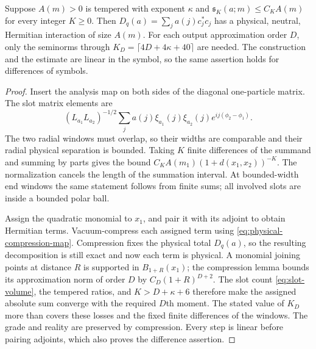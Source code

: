 \begin{lemma}\label{locality:one-body-symbol}
Suppose $A(m)>0$ is tempered with exponent $\kappa$ and
$\mathfrak s_K(a;m)\leq C_KA(m)$ for every integer $K\geq0$.
Then $D_q(a)=\sum_j a(j)c_j^*c_j$ has a physical, neutral, Hermitian
interaction of size $A(m)$.  For each output approximation order $D$,
only the seminorms through
$K_D=\lceil4D+4\kappa+40\rceil$ are needed.  The construction and
the estimate are linear in the symbol, so the same assertion holds
for differences of symbols.
\end{lemma}

\begin{proof}
Insert the analysis map on both sides of the diagonal one-particle
matrix.  The slot matrix elements are
\[
 (L_{a_1}L_{a_2})^{-1/2}\sum_j
   a(j)\xi_{a_1}(j)\xi_{a_2}(j)
                  e^{ij(\phi_2-\phi_1)}.
\]
The two radial windows must overlap, so their widths are comparable
and their radial physical separation is bounded.  Taking $K$
finite differences of the summand and summing by parts gives the
bound $C_K A(m_1)(1+d(x_1,x_2))^{-K}$.  The normalization cancels
the length of the summation interval.  At bounded-width end windows
the same statement follows from finite sums; all involved slots are
inside a bounded polar ball.

Assign the quadratic monomial to $x_1$, and pair it with its adjoint
to obtain Hermitian terms.  Vacuum-compress each assigned term using
\eqref{eq:physical-compression-map}.  Compression fixes the physical
total $D_q(a)$, so the resulting decomposition is still exact and
now each term is physical.  A monomial joining points at distance
$R$ is supported in $B_{1+R}(x_1)$; the compression lemma bounds its
approximation norm of order $D$ by $C_D(1+R)^{D+2}$.
The slot count \eqref{eq:slot-volume}, the tempered ratios, and
$K>D+\kappa+6$ therefore make the assigned absolute sum converge
with the required $D$th moment.  The stated value of $K_D$ more than
covers these losses and the fixed finite differences of the windows.
The grade and reality are preserved by compression.  Every step is
linear before pairing adjoints, which also proves the difference
assertion.
\end{proof}

